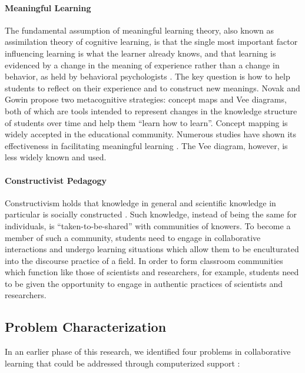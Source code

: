 \paragraph{Meaningful Learning}

The fundamental assumption of meaningful learning theory, also known as
assimilation theory of cognitive learning, is that the single most
important factor influencing learning is what the learner already knows,
and that learning is evidenced by a change in the meaning of experience
rather than a change in behavior, as held by behavioral psychologists
\cite{Ausubel63,Ausubel78}. The key question is how to help students to
reflect on their experience and to construct new meanings.  Novak and Gowin
\cite{Novak84} propose two metacognitive strategies: concept maps and Vee
diagrams, both of which are tools intended to represent changes in the
knowledge structure of students over time and help them ``learn how to
learn''.  Concept mapping is widely accepted in the educational community.
Numerous studies have shown its effectiveness in facilitating meaningful
learning \cite{Cliburn90,Novak90,Roth92}. The Vee diagram, however, is less
widely known and used.

\paragraph{Constructivist Pedagogy}

Constructivism holds that knowledge in general and scientific knowledge in
particular is socially constructed \cite{Berger66,Knorr-Cetina81}. Such
knowledge, instead of being the same for individuals, is
``taken-to-be-shared'' \cite{Roth92} with communities of knowers. To become
a member of such a community, students need to engage in collaborative
interactions and undergo learning situations which allow them to be
enculturated into the discourse practice of a field. In order to form
classroom communities which function like those of scientists and
researchers, for example, students need to be given the opportunity to
engage in authentic practices of scientists and researchers.

\subsection{Problem Characterization}
\label{sec:problem1}

In an earlier phase of this research, we identified four problems in
collaborative learning that could be addressed through computerized support
\cite{csdl-92-03}:

